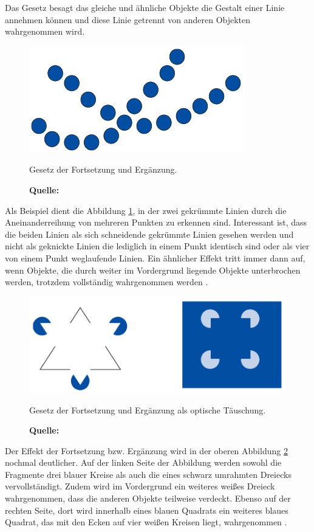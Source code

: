 Das Gesetz besagt das gleiche und ähnliche Objekte die Gestalt einer Linie annehmen können und diese Linie getrennt von anderen Objekten wahrgenommen wird.
\begin{figure}[H]
  \centering
  \includegraphics[scale=1]{img/gesetz_der_Fortsetzung_und_Ergaenzung.PNG}
  \caption{Gesetz der Fortsetzung und Ergänzung.}
    \caption*{\textbf{Quelle:} \citep{Dahm2006}}
  \label{fig:fortsetzungUndErgaenzung1}
\end{figure}
Als Beispiel dient die Abbildung \ref{fig:fortsetzungUndErgaenzung1}, in der zwei gekrümmte Linien durch die Aneinanderreihung von mehreren Punkten zu erkennen sind. Interessant ist, dass die beiden Linien als sich schneidende gekrümmte Linien gesehen werden und nicht als geknickte Linien die lediglich in einem Punkt identisch sind oder als vier von einem Punkt weglaufende Linien. Ein ähnlicher Effekt tritt immer dann auf, wenn Objekte, die durch weiter im Vordergrund liegende Objekte unterbrochen werden, trotzdem vollständig wahrgenommen werden \citep[vgl.][61f]{Dahm2006}.
\begin{figure}[H]
  \centering
  \includegraphics[scale=1]{img/gesetz_der_Fortsetzung_und_Ergaenzung2.PNG}
  \caption{Gesetz der Fortsetzung und Ergänzung als optische Täuschung.}
    \caption*{\textbf{Quelle:} \citep{Dahm2006}}
  \label{fig:fortsetzungUndErgaenzung2}
\end{figure}
Der Effekt der Fortsetzung bzw. Ergänzung wird in der oberen Abbildung \ref{fig:fortsetzungUndErgaenzung2} nochmal deutlicher. Auf der linken Seite der Abbildung werden sowohl die Fragmente drei blauer Kreise als auch die eines schwarz umrahmten Dreiecks vervollständigt. Zudem wird im Vordergrund ein weiteres weißes Dreieck wahrgenommen, dass die anderen Objekte teilweise verdeckt. Ebenso auf der rechten Seite, dort wird innerhalb eines blauen Quadrats ein weiteres blaues Quadrat, das mit den Ecken auf vier weißen Kreisen liegt, wahrgenommen \citep[vgl.][61f]{Dahm2006}.

